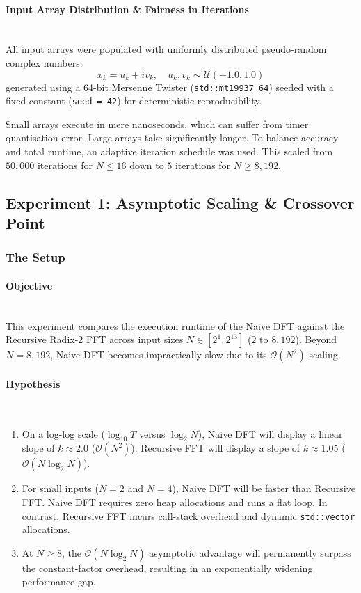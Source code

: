 \documentclass{article}
\begin{document}
\paragraph{Input Array Distribution \& Fairness in Iterations}~{}\\
All input arrays were populated with uniformly distributed pseudo-random complex numbers:
\begin{equation}
x_k = u_k + i v_k, \quad u_k, v_k \sim \mathcal{U}(-1.0, 1.0)
\end{equation}
generated using a 64-bit Mersenne Twister (\texttt{std::mt19937\_64}) seeded with a fixed constant (\texttt{seed = 42}) for deterministic reproducibility. 

Small arrays execute in mere nanoseconds, which can suffer from timer quantisation error. Large arrays take significantly longer. To balance accuracy and total runtime, an adaptive iteration schedule was used. This scaled from $50,000$ iterations for $N \le 16$ down to $5$ iterations for $N \ge 8,192$.

\subsection{Experiment 1: Asymptotic Scaling \& Crossover Point} \label{sec:exp1_design}
\subsubsection*{The Setup}
\paragraph{Objective}~{}\\
This experiment compares the execution runtime of the Naive DFT against the Recursive Radix-2 FFT across input sizes $N \in [2^1, 2^{13}]$ ($2$ to $8,192$). Beyond $N = 8,192$, Naive DFT becomes impractically slow due to its $\mathcal{O}(N^2)$ scaling.

\paragraph{Hypothesis}~{}\\
\begin{enumerate}
    \item On a log-log scale ($\log_{10} T$ versus $\log_2 N$), Naive DFT will display a linear slope of $k \approx 2.0$ ($\mathcal{O}(N^2)$). Recursive FFT will display a slope of $k \approx 1.05$ ($\mathcal{O}(N \log_2 N)$).
    \item For small inputs ($N = 2$ and $N = 4$), Naive DFT will be faster than Recursive FFT. Naive DFT requires zero heap allocations and runs a flat loop. In contrast, Recursive FFT incurs call-stack overhead and dynamic \texttt{std::vector} allocations.
    \item At $N \ge 8$, the $\mathcal{O}(N \log_2 N)$ asymptotic advantage will permanently surpass the constant-factor overhead, resulting in an exponentially widening performance gap.
\end{enumerate}
\end{document}
